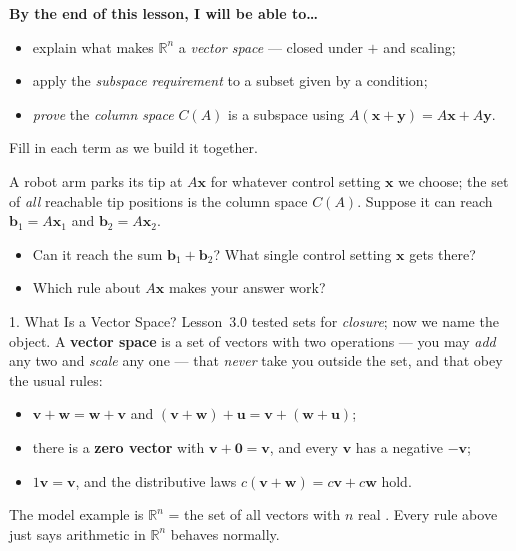 \documentclass[10pt]{article}
\newcommand{\vv}{\mathbf{v}}
\newcommand{\ww}{\mathbf{w}}
\newcommand{\xx}{\mathbf{x}}
\newcommand{\yy}{\mathbf{y}}
\newcommand{\bb}{\mathbf{b}}
\newcommand{\zero}{\mathbf{0}}
\begin{document}
\namedateperiod

\vspace{0.12in}

\begin{objectivebox}
\textbf{By the end of this lesson, I will be able to\dots}
\begin{itemize}\setlength{\itemsep}{2pt}
  \item explain what makes $\mathbb{R}^n$ a \emph{vector space} --- closed under $+$ and scaling;
  \item apply the \emph{subspace requirement} to a subset given by a condition;
  \item \emph{prove} the \emph{column space} $C(A)$ is a subspace using $A(\xx+\yy)=A\xx+A\yy$.
\end{itemize}
\end{objectivebox}

\vspace{0.10in}

\begin{vocabbox}
\small
Fill in each term as we build it together.
\vspace{2pt}
\termblanklong{Zero subspace $\{\zero\}$}
\end{vocabbox}

\begin{hookbox}
A robot arm parks its tip at $A\xx$ for whatever control setting $\xx$ we choose; the set of
\emph{all} reachable tip positions is the column space $C(A)$. Suppose it can reach
$\bb_1=A\xx_1$ and $\bb_2=A\xx_2$.
\begin{itemize}\setlength{\itemsep}{1pt}
  \item Can it reach the sum $\bb_1+\bb_2$? What single control setting $\xx$ gets there? \writeline
  \item Which rule about $A\xx$ makes your answer work? \writeline
\end{itemize}
\end{hookbox}

\begin{notesbox}{1. What Is a Vector Space?}
Lesson~3.0 tested sets for \emph{closure}; now we name the object. A \textbf{vector space} is a set
of vectors with two operations --- you may \emph{add} any two and \emph{scale} any one --- that
\emph{never} take you outside the set, and that obey the usual rules:
\begin{itemize}[leftmargin=1.5em, itemsep=1pt]
  \item $\vv+\ww=\ww+\vv$ and $(\vv+\ww)+\mathbf u=\vv+(\ww+\mathbf u)$;
  \item there is a \textbf{zero vector} with $\vv+\zero=\vv$, and every $\vv$ has a negative $-\vv$;
  \item $1\vv=\vv$, and the distributive laws $c(\vv+\ww)=c\vv+c\ww$ hold.
\end{itemize}
The model example is $\mathbb{R}^n$ = the set of all vectors with $n$ real \blank{2.4cm}. Every rule
above just says arithmetic in $\mathbb{R}^n$ behaves normally.
\end{notesbox}
\end{document}
